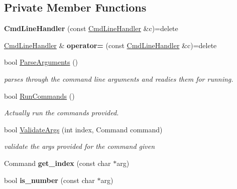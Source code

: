 \subsection*{Private Member Functions}
\begin{DoxyCompactItemize}
\item 
{\bfseries Cmd\+Line\+Handler} (const \hyperlink{classCmdLineHandler}{Cmd\+Line\+Handler} \&c)=delete\hypertarget{classCmdLineHandler_ac771a7d5753d6b70829d01c063bbe304}{}\label{classCmdLineHandler_ac771a7d5753d6b70829d01c063bbe304}

\item 
\hyperlink{classCmdLineHandler}{Cmd\+Line\+Handler} \& {\bfseries operator=} (const \hyperlink{classCmdLineHandler}{Cmd\+Line\+Handler} \&c)=delete\hypertarget{classCmdLineHandler_ab9b698a78dbc316a60acf4d0d77d9c3c}{}\label{classCmdLineHandler_ab9b698a78dbc316a60acf4d0d77d9c3c}

\item 
bool \hyperlink{classCmdLineHandler_af196c0167259bb02dbbeb364af946a11}{Parse\+Arguments} ()
\begin{DoxyCompactList}\small\item\em parses through the command line arguments and readies them for running. \end{DoxyCompactList}\item 
bool \hyperlink{classCmdLineHandler_a0f9a3b8c5366f7efadde7ec8c8b7b166}{Run\+Commands} ()
\begin{DoxyCompactList}\small\item\em Actually run the commands provided. \end{DoxyCompactList}\item 
bool \hyperlink{classCmdLineHandler_aa169b29cf5897c1b93064fd29c7b1e7d}{Validate\+Args} (int index, Command command)
\begin{DoxyCompactList}\small\item\em validate the args provided for the command given \end{DoxyCompactList}\item 
Command {\bfseries get\+\_\+index} (const char $\ast$arg)\hypertarget{classCmdLineHandler_a61d490a0d2f3ebad0de5510db18ed9cb}{}\label{classCmdLineHandler_a61d490a0d2f3ebad0de5510db18ed9cb}

\item 
bool {\bfseries is\+\_\+number} (const char $\ast$arg)\hypertarget{classCmdLineHandler_a7d1663fae9409862ef62602c670cb820}{}\label{classCmdLineHandler_a7d1663fae9409862ef62602c670cb820}

\end{DoxyCompactItemize}
